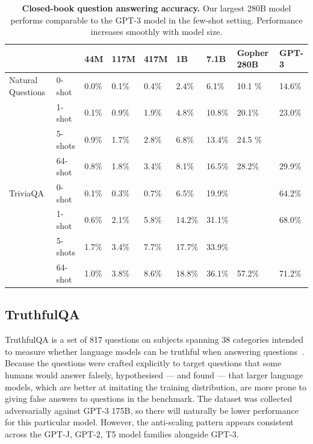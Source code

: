 \documentclass[11pt, a4paper, logo, internal, copyright, nonumbering]{deepmind}
\begin{document}
\begin{table}[b]
\scriptsize
\centering
\begin{tabular}{llllllll|l}
\toprule
& & \textbf{44M}     & \textbf{117M}    & \textbf{417M}    & \textbf{1B}   &  \textbf{7.1B}   &  \textbf{Gopher 280B} & GPT-3 \\
\midrule
Natural Questions & 0-shot      &  0.0\% &  0.1\% &  0.4\% &  2.4\% &   6.1\% &     10.1 \% & 14.6\% \\
& 1-shot      &  0.1\% &  0.9\% &  1.9\% &  4.8\% &  10.8\% &  20.1\% & 23.0\% \\
& 5-shots     &  0.9\% &  1.7\% &  2.8\% &  6.8\% &  13.4\% &     24.5 \% & \\
& 64-shot     &  0.8\% &  1.8\% &  3.4\% &  8.1\% &  16.5\% &  28.2\% & 29.9\% \\
TriviaQA & 0-shot      &  0.1\% &  0.3\% &  0.7\% &   6.5\% &  19.9\% & & 64.2\% \\
& 1-shot      &  0.6\% &  2.1\% &  5.8\% &  14.2\% &  31.1\% & & 68.0\% \\
& 5-shots     &  1.7\% &  3.4\% &  7.7\% &  17.7\% &  33.9\% & &\\
& 64-shot     &  1.0\% &  3.8\% &  8.6\% &  18.8\% &  36.1\% & 57.2\% & 71.2\%\\
\bottomrule
\end{tabular}
\caption{\textbf{Closed-book question answering accuracy.} Our largest 280B model performs comparable to the GPT-3 model in the few-shot setting. Performance increases smoothly with model size.}
\end{table}

\subsection{TruthfulQA}
\label{appendix:truthfulqa}

TruthfulQA is a set of 817 questions on subjects spanning 38 categories intended to measure whether language models can be truthful when answering questions~\citep{truthfulqa}. Because the questions were crafted explicitly to target questions that some humans would answer falsely, \cite{truthfulqa} hypothesised --- and found --- that larger language models, which are better at imitating the training distribution, are more prone to giving false answers to questions in the benchmark. The dataset was collected adversarially against GPT-3 175B, so there will naturally be lower performance for this particular model. However, the anti-scaling pattern appears consistent across the GPT-J, GPT-2, T5 model families alongside GPT-3.
\end{document}
